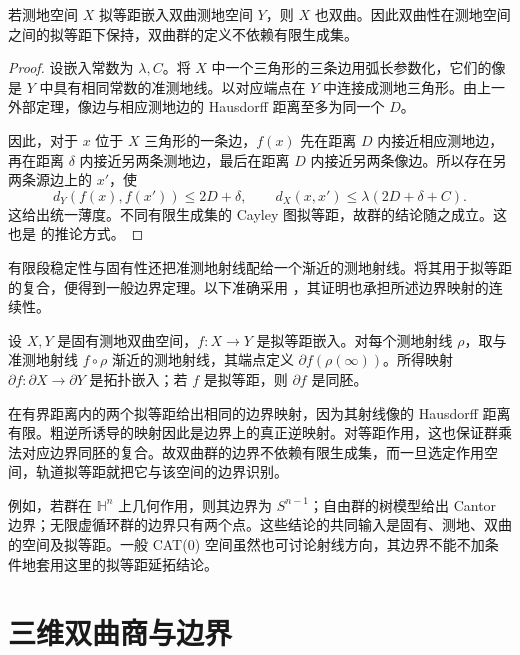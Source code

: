 \begin{corollary}\label{g3:cor:D-hyperbolicity-quasi-isometry}
	若测地空间 \(X\) 拟等距嵌入双曲测地空间 \(Y\)，则 \(X\) 也双曲。因此双曲性在测地空间之间的拟等距下保持，双曲群的定义不依赖有限生成集。
\end{corollary}
\begin{proof}
	设嵌入常数为 \(\lambda,C\)。将 \(X\) 中一个三角形的三条边用弧长参数化，它们的像是 \(Y\) 中具有相同常数的准测地线。以对应端点在 \(Y\) 中连接成测地三角形。由上一外部定理，像边与相应测地边的 Hausdorff 距离至多为同一个 \(D\)。

	因此，对于 \(x\) 位于 \(X\) 三角形的一条边，\(f(x)\) 先在距离 \(D\) 内接近相应测地边，再在距离 \(\delta\) 内接近另两条测地边，最后在距离 \(D\) 内接近另两条像边。所以存在另两条源边上的 \(x'\)，使
	\[
		d_Y(f(x),f(x'))\le2D+\delta,
		\qquad
		d_X(x,x')\le\lambda(2D+\delta+C).
	\]
	这给出统一薄度。不同有限生成集的 Cayley 图拟等距，故群的结论随之成立。这也是 \cite[定理III.H.1.9，第402页]{BridsonHaefliger1999MetricSpaces}的推论方式。
\end{proof}

有限段稳定性与固有性还把准测地射线配给一个渐近的测地射线。将其用于拟等距的复合，便得到一般边界定理。以下准确采用 \cite[定理III.H.3.9，第430--431页]{BridsonHaefliger1999MetricSpaces}，其证明也承担所述边界映射的连续性。

\begin{theorem}\label{g3:thm:D-boundary-quasi-isometry}
	设 \(X,Y\) 是固有测地双曲空间，\(f:X\rightarrow Y\) 是拟等距嵌入。对每个测地射线 \(\rho\)，取与准测地射线 \(f\circ\rho\) 渐近的测地射线，其端点定义 \(\partial f(\rho(\infty))\)。所得映射 \(\partial f:\partial X\rightarrow\partial Y\) 是拓扑嵌入；若 \(f\) 是拟等距，则 \(\partial f\) 是同胚。
\end{theorem}

在有界距离内的两个拟等距给出相同的边界映射，因为其射线像的 Hausdorff 距离有限。粗逆所诱导的映射因此是边界上的真正逆映射。对等距作用，这也保证群乘法对应边界同胚的复合。故双曲群的边界不依赖有限生成集，而一旦选定作用空间，轨道拟等距就把它与该空间的边界识别。

\ProseParagraphBreak

例如，若群在 \(\mathbb H^n\) 上几何作用，则其边界为 \(S^{n-1}\)；自由群的树模型给出 Cantor 边界；无限虚循环群的边界只有两个点。这些结论的共同输入是固有、测地、双曲的空间及拟等距。一般 CAT(0) 空间虽然也可讨论射线方向，其边界不能不加条件地套用这里的拟等距延拓结论。

\section{三维双曲商与边界}
\label{g3:sec:D04}

